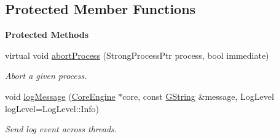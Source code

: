 \subsection*{Protected Member Functions}
\begin{Indent}\textbf{ Protected Methods}\par
\begin{DoxyCompactItemize}
\item 
\mbox{\label{classrev_1_1_process_queue_a4012cafff5fc2b25a7e406e2fdb911a9}} 
virtual void \mbox{\hyperlink{classrev_1_1_process_queue_a4012cafff5fc2b25a7e406e2fdb911a9}{abort\+Process}} (Strong\+Process\+Ptr process, bool immediate)
\begin{DoxyCompactList}\small\item\em Abort a given process. \end{DoxyCompactList}\item 
\mbox{\label{classrev_1_1_process_queue_aff1e2701a2f266cb19af1f22eef65e1e}} 
void \mbox{\hyperlink{classrev_1_1_process_queue_aff1e2701a2f266cb19af1f22eef65e1e}{log\+Message}} (\mbox{\hyperlink{classrev_1_1_core_engine}{Core\+Engine}} $\ast$core, const \mbox{\hyperlink{classrev_1_1_g_string}{G\+String}} \&message, Log\+Level log\+Level=Log\+Level\+::\+Info)
\begin{DoxyCompactList}\small\item\em Send log event across threads. \end{DoxyCompactList}\end{DoxyCompactItemize}
\end{Indent}
